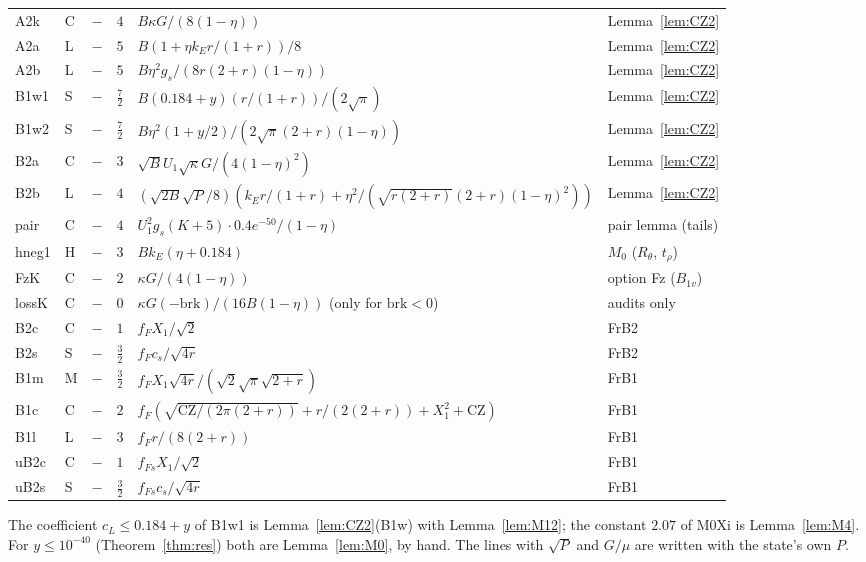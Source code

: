 \begin{table}
\begin{ruledtabular}
\begin{tabular}{p{}p{}p{}p{}p{}p{}}
A2k & C & $-$ & $4$ & $B\kappa G/(8(1-\eta))$ & Lemma~\ref{lem:CZ2}\\
A2a & L & $-$ & $5$ & $B(1+\eta k_Er/(1+r))/8$ & Lemma~\ref{lem:CZ2}\\
A2b & L & $-$ & $5$ & $B\eta^2g_s/(8r(2+r)(1-\eta))$ & Lemma~\ref{lem:CZ2}\\
B1w1 & S & $-$ & $\frac72$ & $B(0.184+y)(r/(1+r))/(2\sqrt\pi)$ & Lemma~\ref{lem:CZ2}\\
B1w2 & S & $-$ & $\frac72$ & $B\eta^2(1+y/2)/(2\sqrt\pi(2+r)(1-\eta))$ & Lemma~\ref{lem:CZ2}\\
B2a & C & $-$ & $3$ & $\sqrt BU_1\sqrt\kappa G/(4(1-\eta)^2)$ & Lemma~\ref{lem:CZ2}\\
B2b & L & $-$ & $4$ & $(\sqrt{2B}\sqrt P/8)(k_Er/(1+r)+\eta^2/(\sqrt{r(2+r)}(2+r)(1-\eta)^2))$ & Lemma~\ref{lem:CZ2}\\
pair & C & $-$ & $4$ & $U_1^2g_s(K+5)\cdot0.4e^{-50}/(1-\eta)$ & pair lemma (tails)\\
hneg1 & H & $-$ & $3$ & $Bk_E(\eta+0.184)$ & $M_0$ ($R_\theta$, $t_\rho$)\\
FzK & C & $-$ & $2$ & $\kappa G/(4(1-\eta))$ & option Fz ($B_{1v}$)\\
lossK & C & $-$ & $0$ & $\kappa G(-\mathrm{brk})/(16B(1-\eta))$ (only for $\mathrm{brk}<0$) & audits only\\
B2c & C & $-$ & $1$ & $f_FX_1/\sqrt2$ & FrB2\\
B2s & S & $-$ & $\frac32$ & $f_Fc_s/\sqrt{4r}$ & FrB2\\
B1m & M & $-$ & $\frac32$ & $f_FX_1\sqrt{4r}/(\sqrt2\sqrt\pi\sqrt{2+r})$ & FrB1\\
B1c & C & $-$ & $2$ & $f_F(\sqrt{\mathrm{CZ}/(2\pi(2+r))}+r/(2(2+r))+X_1^2+\mathrm{CZ})$ & FrB1\\
B1l & L & $-$ & $3$ & $f_Fr/(8(2+r))$ & FrB1\\
uB2c & C & $-$ & $1$ & $f_{Fs}X_1/\sqrt2$ & FrB1\\
uB2s & S & $-$ & $\frac32$ & $f_{Fs}c_s/\sqrt{4r}$ & FrB1\\
\end{tabular}
\end{ruledtabular}
\end{table}

The coefficient $c_L\le0.184+y$ of B1w1 is Lemma~\ref{lem:CZ2}(B1w) with Lemma~\ref{lem:M12}; the constant $2.07$ of M0Xi is Lemma~\ref{lem:M4}. For $y\le10^{-40}$ (Theorem~\ref{thm:res}) both are Lemma~\ref{lem:M0}, by hand.
The lines with $\sqrt P$ and $G/\mu$ are written with the state's own $P$.


